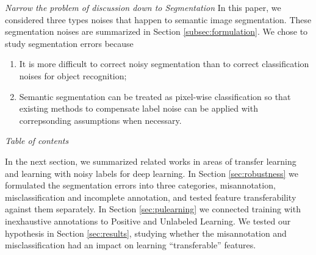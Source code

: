\noindent \textit{Narrow the problem of discussion down to Segmentation}
\noindent
In this paper, we considered three types noises that happen to semantic image segmentation.
These segmentation noises are summarized in Section \ref{subsec:formulation}.
We chose to study segmentation errors because
\begin{enumerate}
  \item It is more difficult to correct noisy segmentation than to correct classification noises for object recognition;
  \item Semantic segmentation can be treated as pixel-wise classification so that existing methods to compensate label noise can be applied with correpsonding assumptions when necessary.
\end{enumerate}


\noindent \textit{Table of contents}

\noindent
In the next section, we summarized related works in areas of transfer learning and learning with noisy labels for deep learning.
In Section \ref{sec:robustness} we formulated the segmentation errors into three categories, misannotation, misclassification and incomplete annotation, and tested feature transferability against them separately.
In Section \ref{sec:pulearning} we connected training with inexhaustive annotations to Positive and Unlabeled Learning.
We tested our hypothesis in Section \ref{sec:results}, studying whether the misannotation and misclassification had an impact on learning ``transferable'' features.




%

